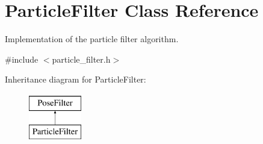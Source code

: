 \hypertarget{classParticleFilter}{\section{Particle\-Filter Class Reference}
\label{classParticleFilter}
}


Implementation of the particle filter algorithm.  




{\ttfamily \#include $<$particle\-\_\-filter.\-h$>$}

Inheritance diagram for Particle\-Filter\-:\begin{figure}[H]
\begin{center}
\leavevmode
\includegraphics[height=2.000000cm]{classParticleFilter}
\end{center}
\end{figure}
